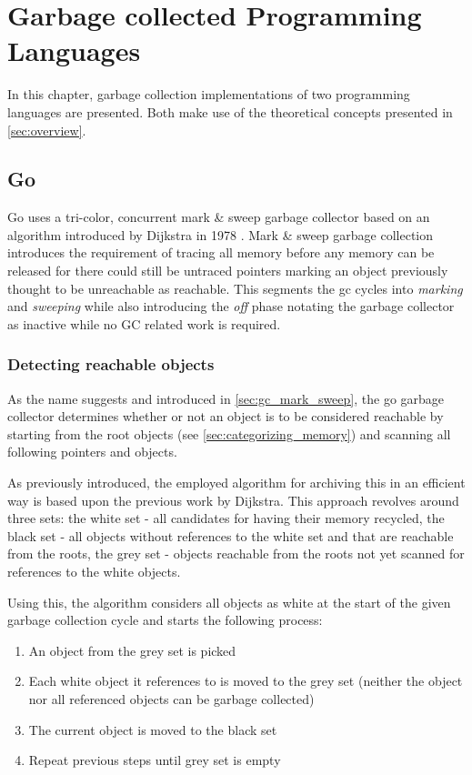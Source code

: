 \chapter{Garbage collected Programming Languages}

In this chapter, garbage collection implementations of two programming
languages are presented. Both make use of the theoretical concepts presented
in \autoref{sec:overview}.

\section{Go}

Go uses a tri-color, concurrent mark \& sweep garbage collector based on an
algorithm introduced by Dijkstra in 1978 \cite{dijkstra-gc-1978}. Mark \& sweep
garbage collection introduces the requirement of tracing all memory before any
memory can be released \cite[The GC cycle]{go_gcguide_2022} for there could
still be untraced pointers marking an object previously thought to be
unreachable as reachable. This segments the gc cycles into \textit{marking} and
\textit{sweeping} while also introducing the \textit{off} phase notating the
garbage collector as inactive while no GC related work is required.

\subsection{Detecting reachable objects}

As the name suggests and introduced in \autoref{sec:gc_mark_sweep}, the go
garbage collector determines whether or not an object is to be considered
reachable by starting from the root objects (see
\autoref{sec:categorizing_memory}) and scanning all following pointers and
objects.

As previously introduced, the employed algorithm for archiving this in an
efficient way is based upon the previous work by Dijkstra. This approach
revolves around three sets: the white set - all candidates for having their
memory recycled, the black set - all objects without references to the white
set and that are reachable from the roots, the grey set - objects reachable
from the roots not yet scanned for references to the white objects.

Using this, the algorithm considers all objects as white at the start of the
given garbage collection cycle and starts the following process:

\begin{enumerate}
    \item An object from the grey set is picked 
    \item Each white object it references to is moved to the grey set (neither
        the object nor all referenced objects can be garbage collected) 
    \item The current object is moved to the black set 
    \item Repeat previous steps until grey set is empty
\end{enumerate}

